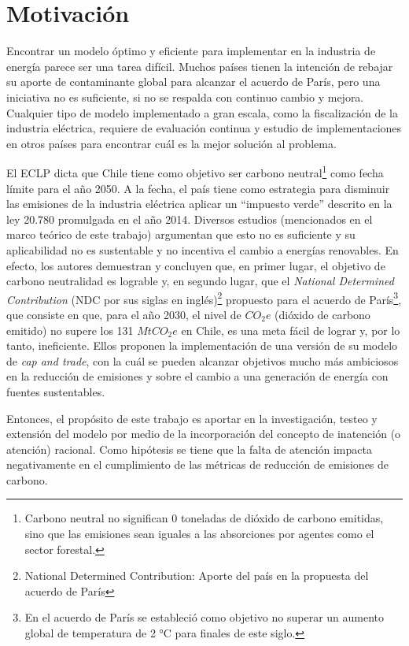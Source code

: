 \section{Motivación}
Encontrar un modelo óptimo y eficiente para implementar en la industria de energía parece ser una tarea difícil. Muchos países tienen la intención de rebajar su aporte de contaminante global para alcanzar el acuerdo de París, pero una iniciativa no es suficiente, si no se respalda con continuo cambio y mejora. Cualquier tipo de modelo implementado a gran escala, como la fiscalización de la industria eléctrica, requiere de evaluación continua y estudio de implementaciones en otros países para encontrar cuál es la mejor solución al problema.
\vspace{2.5mm}

El ECLP dicta que Chile tiene como objetivo ser carbono neutral\footnote{Carbono neutral no significan 0 toneladas de dióxido de carbono emitidas, sino que las emisiones sean iguales a las absorciones por agentes como el sector forestal.} como fecha límite para el año 2050. A la fecha, el país tiene como estrategia para disminuir las emisiones de la industria eléctrica aplicar un ``impuesto verde'' descrito en la ley 20.780 promulgada en el año 2014. Diversos estudios (mencionados en el marco teórico de este trabajo) argumentan que esto no es suficiente y su aplicabilidad no es sustentable y no incentiva el cambio a energías renovables. En efecto, los autores  demuestran y concluyen que, en primer lugar, el objetivo de carbono neutralidad es lograble y, en segundo lugar, que el \emph{National Determined Contribution}  (NDC por sus siglas en inglés)\footnote{National Determined Contribution: Aporte del país en la propuesta del acuerdo de París}  propuesto para el acuerdo de París\footnote{En el acuerdo de París se estableció como objetivo no superar un aumento global de temperatura de 2 °C para finales de este siglo.}, que consiste en que, para el año 2030, el nivel de $CO_2 e$ (dióxido de carbono emitido) no supere los 131 $MtCO_2 e$ en Chile, es una meta fácil de lograr y, por lo tanto, ineficiente. Ellos proponen la implementación de una versión de su modelo de \emph{cap and trade}, con la cuál se pueden alcanzar objetivos mucho más ambiciosos en la reducción de emisiones y sobre el cambio a una generación de energía con fuentes sustentables.
\vspace{2.5mm}

Entonces, el propósito de este trabajo es aportar en la investigación, testeo y extensión del modelo por medio de la incorporación del concepto de inatención (o atención) racional. Como hipótesis se tiene que la falta de atención impacta negativamente en el cumplimiento de las métricas de reducción de emisiones de carbono.
\vspace{2.5mm}

